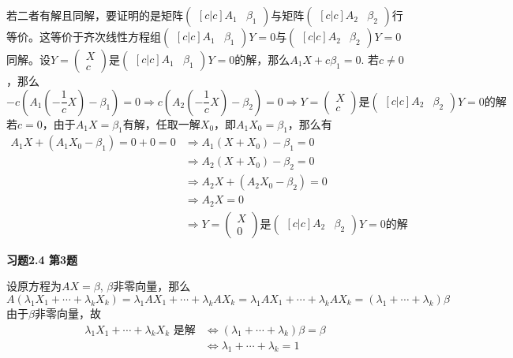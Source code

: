若二者有解且同解，要证明的是矩阵$\begin{pmatrix}[c|c] A_1 & \beta_1 \end{pmatrix}$与矩阵$\begin{pmatrix}[c|c] A_2 & \beta_2 \end{pmatrix}$行等价。这等价于齐次线性方程组$\begin{pmatrix}[c|c] A_1 & \beta_1 \end{pmatrix} Y = 0$与$\begin{pmatrix}[c|c] A_2 & \beta_2 \end{pmatrix} Y = 0$同解。设$Y = \begin{pmatrix} X \\ c \end{pmatrix}$是$\begin{pmatrix}[c|c] A_1 & \beta_1 \end{pmatrix} Y = 0$的解，那么$A_1X + c\beta_1 = 0$. 若$c\neq 0$，那么
$$-c(A_1(-\dfrac{1}{c}X) - \beta_1) = 0 \Longrightarrow c(A_2(-\dfrac{1}{c}X) - \beta_2) = 0 \Longrightarrow \text{$Y = \begin{pmatrix} X \\ c \end{pmatrix}$是$\begin{pmatrix}[c|c] A_2 & \beta_2 \end{pmatrix} Y = 0$的解}$$
若$c = 0$，由于$A_1X = \beta_1$有解，任取一解$X_0$，即$A_1X_0 = \beta_1$，那么有
\begin{align*}
A_1X+(A_1X_0-\beta_1) = 0+0 = 0 & \Longrightarrow A_1(X+X_0)-\beta_1 = 0 \\
& \Longrightarrow A_2(X+X_0)-\beta_2 = 0 \\
& \Longrightarrow A_2X+(A_2X_0-\beta_2) = 0 \\
& \Longrightarrow A_2X = 0 \\
& \Longrightarrow \text{$Y = \begin{pmatrix} X \\ 0 \end{pmatrix}$是$\begin{pmatrix}[c|c] A_2 & \beta_2 \end{pmatrix} Y = 0$的解}
\end{align*}

\newpageorvspace

{\bf 习题2.4 第3题}

设原方程为$AX = \beta$, $\beta$非零向量，那么
$$A(\lambda_1X_1+\cdots+\lambda_kX_k) = \lambda_1AX_1+\cdots+\lambda_kAX_k = \lambda_1AX_1+\cdots+\lambda_kAX_k = (\lambda_1+\cdots+\lambda_k)\beta$$
由于$\beta$非零向量，故
\begin{align*}
\lambda_1X_1+\cdots+\lambda_kX_k \text{ 是解} & \Longleftrightarrow (\lambda_1+\cdots+\lambda_k)\beta = \beta \\
& \Longleftrightarrow \lambda_1+\cdots+\lambda_k = 1
\end{align*}


